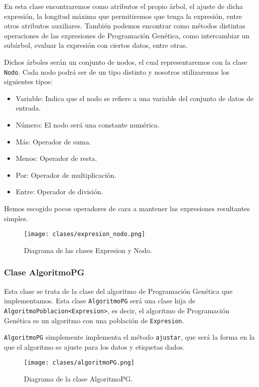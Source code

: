 En esta clase encontraremos como atributos el propio árbol, el ajuste de dicha expresión, la longitud máxima que permitiremos que tenga la expresión, entre otros atributos auxiliares. También podemos encontrar como métodos distintas operaciones de las expresiones de Programación Genética, como intercambiar un subárbol, evaluar la expresión con ciertos datos, entre otras.

Dichos árboles serán un conjunto de nodos, el cual representaremos con la clase \texttt{Nodo}. Cada nodo podrá ser de un tipo distinto y nosotros utilizaremos los siguientes tipos:

\begin{itemize}
	\item Variable: Indica que el nodo se refiere a una variable del conjunto de datos de entrada.
	\item Número: El nodo será una constante numérica.
	\item Más: Operador de suma.
	\item Menos: Operador de resta.
	\item Por: Operador de multiplicación.
	\item Entre: Operador de división.
\end{itemize}

Hemos escogido pocos operadores de cara a mantener las expresiones resultantes simples.

\begin{figure}[H]
	 \centering
	 \texttt{[image: clases/expresion\_nodo.png]}
	 \caption{Diagrama de las clases Expresion y Nodo.}
	\label{fig:diagrama_clase_expresion_nodo}
\end{figure}

\newpage

\subsubsection{Clase AlgoritmoPG}

Esta clase se trata de la clase del algoritmo de Programación Genética que implementamos. Esta clase \texttt{AlgoritmoPG} será una clase hija de \texttt{AlgoritmoPoblacion<Expresion>}, es decir, el algoritmo de Programación Genética es un algoritmo con una población de \texttt{Expresion}.

\texttt{AlgoritmoPG} simplemente implementa el método \texttt{ajustar}, que será la forma en la que el algoritmo se ajuste para los datos y etiquetas dados.


\begin{figure}[H]
	 \centering
	 \texttt{[image: clases/algoritmoPG.png]}
	 \caption{Diagrama de la clase AlgoritmoPG.}
	\label{fig:diagrama_clase_algoritmoPG}
\end{figure}

